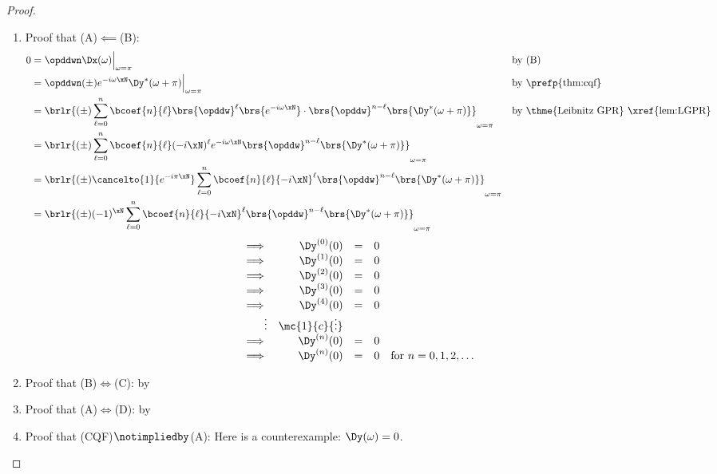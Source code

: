 \begin{proof}
\begin{enumerate}
  \item Proof that (A)$\impliedby$(B): 
    \begin{align*}
      0
        &= \opddwn\Dx(\omega)\Big|_{\omega=\pi}
        && \text{by (B)}
      \\&= \opddwn(\pm) e^{-i\omega\xN} \Dy^\ast(\omega+\pi)\Big|_{\omega=\pi}
        && \text{by \prefp{thm:cqf}}
      \\&= \brlr{(\pm) \sum_{\ell=0}^n \bcoef{n}{\ell} \brs{\opddw}^\ell\brs{e^{-i\omega\xN}}\cdot\brs{\opddw}^{n-\ell}\brs{\Dy^\ast(\omega+\pi)}}_{\omega=\pi}
        && \text{by \thme{Leibnitz GPR} \xref{lem:LGPR}}
      \\&= \brlr{(\pm) \sum_{\ell=0}^n \bcoef{n}{\ell} (-i\xN)^\ell e^{-i\omega\xN}\brs{\opddw}^{n-\ell}\brs{\Dy^\ast(\omega+\pi)}}_{\omega=\pi}
      \\&= \brlr{(\pm) \cancelto{1}{e^{-i\pi\xN}} \sum_{\ell=0}^n \bcoef{n}{\ell} {-i\xN}^\ell \brs{\opddw}^{n-\ell}\brs{\Dy^\ast(\omega+\pi)}}_{\omega=\pi}
      \\&= \brlr{(\pm) (-1)^\xN \sum_{\ell=0}^n \bcoef{n}{\ell} {-i\xN}^\ell \brs{\opddw}^{n-\ell}\brs{\Dy^\ast(\omega+\pi)}}_{\omega=\pi}
    \end{align*}
  \[\begin{array}{r rcl l}
    \implies & \Dy^{(0)}(0) &=& 0 \\
    \implies & \Dy^{(1)}(0) &=& 0 \\
    \implies & \Dy^{(2)}(0) &=& 0 \\
    \implies & \Dy^{(3)}(0) &=& 0 \\
    \implies & \Dy^{(4)}(0) &=& 0 \\
    \vdots   & \mc{1}{c}{\vdots}    \\
    \implies & \Dy^{(n)}(0) &=& 0 \\
    \implies & \Dy^{(n)}(0) &=& 0 & \text{for $n=0,1,2,\ldots$}
  \end{array}\]


  \item Proof that (B)$\iff$(C): by 
  \item Proof that (A)$\iff$(D): by 
  \item Proof that (CQF)$\notimpliedby$(A): Here is a counterexample: $\Dy(\omega)=0$.

\end{enumerate}
\end{proof}






